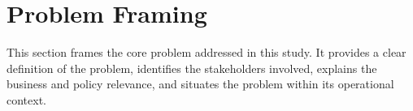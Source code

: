 \documentclass[12pt]{article}
\begin{document}
\setcounter{page}{1}
\pagestyle{fancy}

\section{Problem Framing}
This section frames the core problem addressed in this study. It provides a clear 
definition of the problem, identifies the stakeholders involved, explains the business
 and policy relevance, and situates the problem within its operational context.
\end{document}
